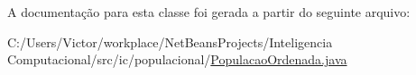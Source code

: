 A documentação para esta classe foi gerada a partir do seguinte arquivo\-:\begin{DoxyCompactItemize}
\item 
C\-:/\-Users/\-Victor/workplace/\-Net\-Beans\-Projects/\-Inteligencia Computacional/src/ic/populacional/\hyperlink{_populacao_ordenada_8java}{Populacao\-Ordenada.\-java}\end{DoxyCompactItemize}
